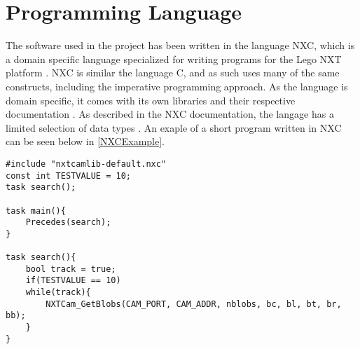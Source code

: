 \section{Programming Language}
The software used in the \name project has been written in the language NXC,
which is a domain specific language specialized for writing programs for the
Lego NXT platform \cite{NXCIntro}. NXC is similar the language C, and as such
uses many of the same constructs, including the imperative programming approach. As the
language is domain specific, it comes with its own libraries and their
respective documentation \cite{NXCIntro}. As described in the NXC documentation,
the langage has a limited selection of data types \cite{}. An exaple of a short
program written in NXC can be seen below in \autoref{NXCExample}.\nl

\begin{minipage}[H]{\linewidth}
\begin{lstlisting}[caption = Exaple of a program written in the NXC language, label = NXCExample] 
#include "nxtcamlib-default.nxc"
const int TESTVALUE = 10;
task search();

task main(){
    Precedes(search);
}

task search(){
	bool track = true;
	if(TESTVALUE == 10)
	while(track){
        NXTCam_GetBlobs(CAM_PORT, CAM_ADDR, nblobs, bc, bl, bt, br, bb);
	}
}
\end{lstlisting}
\end{minipage}
